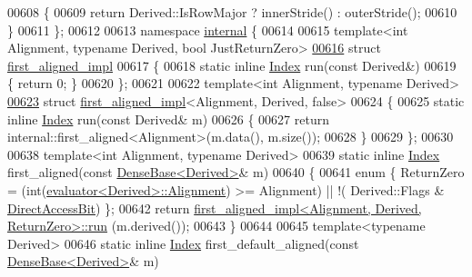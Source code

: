 \begin{DoxyCode}
00608 \textcolor{keyword}{    }\{
00609       \textcolor{keywordflow}{return} Derived::IsRowMajor ? innerStride() : outerStride();
00610     \}
00611 \};
00612 
00613 \textcolor{keyword}{namespace }\hyperlink{namespaceinternal}{internal} \{
00614 
00615 \textcolor{keyword}{template}<\textcolor{keywordtype}{int} Alignment, \textcolor{keyword}{typename} Derived, \textcolor{keywordtype}{bool} JustReturnZero>
\hyperlink{struct_eigen_1_1internal_1_1first__aligned__impl}{00616} \textcolor{keyword}{struct }\hyperlink{struct_eigen_1_1internal_1_1first__aligned__impl}{first\_aligned\_impl}
00617 \{
00618   \textcolor{keyword}{static} \textcolor{keyword}{inline} \hyperlink{namespace_eigen_a62e77e0933482dafde8fe197d9a2cfde}{Index} run(\textcolor{keyword}{const} Derived&)
00619   \{ \textcolor{keywordflow}{return} 0; \}
00620 \};
00621 
00622 \textcolor{keyword}{template}<\textcolor{keywordtype}{int} Alignment, \textcolor{keyword}{typename} Derived>
\hyperlink{struct_eigen_1_1internal_1_1first__aligned__impl_3_01_alignment_00_01_derived_00_01false_01_4}{00623} \textcolor{keyword}{struct }\hyperlink{struct_eigen_1_1internal_1_1first__aligned__impl}{first\_aligned\_impl}<Alignment, Derived, false>
00624 \{
00625   \textcolor{keyword}{static} \textcolor{keyword}{inline} \hyperlink{namespace_eigen_a62e77e0933482dafde8fe197d9a2cfde}{Index} run(\textcolor{keyword}{const} Derived& m)
00626   \{
00627     \textcolor{keywordflow}{return} internal::first\_aligned<Alignment>(m.data(), m.size());
00628   \}
00629 \};
00630 
00638 \textcolor{keyword}{template}<\textcolor{keywordtype}{int} Alignment, \textcolor{keyword}{typename} Derived>
00639 \textcolor{keyword}{static} \textcolor{keyword}{inline} \hyperlink{namespace_eigen_a62e77e0933482dafde8fe197d9a2cfde}{Index} first\_aligned(\textcolor{keyword}{const} \hyperlink{group___core___module_class_eigen_1_1_dense_base}{DenseBase<Derived>}& m)
00640 \{
00641   \textcolor{keyword}{enum} \{ ReturnZero = (int(\hyperlink{struct_eigen_1_1internal_1_1evaluator}{evaluator<Derived>::Alignment}) >= Alignment) || !(
      Derived::Flags & \hyperlink{group__flags_gabf1e9d0516a933445a4c307ad8f14915}{DirectAccessBit}) \};
00642   \textcolor{keywordflow}{return} \hyperlink{struct_eigen_1_1internal_1_1first__aligned__impl}{first\_aligned\_impl<Alignment, Derived, ReturnZero>::run}
      (m.derived());
00643 \}
00644 
00645 \textcolor{keyword}{template}<\textcolor{keyword}{typename} Derived>
00646 \textcolor{keyword}{static} \textcolor{keyword}{inline} \hyperlink{namespace_eigen_a62e77e0933482dafde8fe197d9a2cfde}{Index} first\_default\_aligned(\textcolor{keyword}{const} \hyperlink{group___core___module_class_eigen_1_1_dense_base}{DenseBase<Derived>}& m)

\end{DoxyCode}
